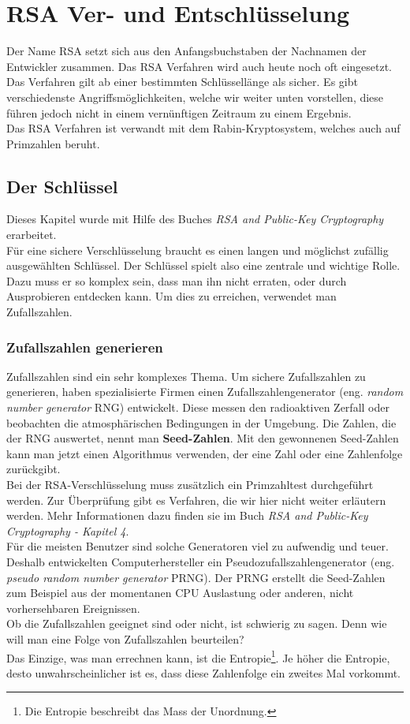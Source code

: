 \newpage
\section{RSA Ver- und Entschlüsselung}
Der Name RSA setzt sich aus den Anfangsbuchstaben der Nachnamen der Entwickler zusammen. Das RSA Verfahren wird auch heute noch oft eingesetzt. Das Verfahren gilt ab einer bestimmten Schlüssellänge als sicher. Es gibt verschiedenste Angriffsmöglichkeiten, welche wir weiter unten vorstellen, diese führen jedoch nicht in einem vernünftigen Zeitraum zu einem Ergebnis. \\
Das RSA Verfahren ist verwandt mit dem Rabin-Kryptosystem, welches auch auf Primzahlen beruht. %

\subsection{Der Schlüssel}
Dieses Kapitel wurde mit Hilfe des Buches \textit{RSA and Public-Key Cryptography} erarbeitet.\\[2ex]
%
Für eine sichere Verschlüsselung braucht es einen langen und möglichst zufällig ausgewählten Schlüssel. Der Schlüssel spielt also eine zentrale und wichtige Rolle. Dazu muss er so komplex sein, dass man ihn nicht erraten, oder durch Ausprobieren entdecken kann. Um dies zu erreichen, verwendet man Zufallszahlen.
%
\subsubsection{Zufallszahlen generieren}
Zufallszahlen sind ein sehr komplexes Thema. Um sichere Zufallszahlen zu generieren, haben spezialisierte Firmen einen Zufallszahlengenerator (eng. \textit{random number generator} RNG) entwickelt. Diese messen den radioaktiven Zerfall oder beobachten die atmosphärischen Bedingungen in der Umgebung. Die Zahlen, die der RNG auswertet, nennt man \textbf{Seed-Zahlen}. Mit den gewonnenen Seed-Zahlen kann man jetzt einen Algorithmus verwenden, der eine Zahl oder eine Zahlenfolge zurückgibt.\\
Bei der RSA-Verschlüsselung muss zusätzlich ein Primzahltest durchgeführt werden.
Zur Überprüfung gibt es Verfahren, die wir hier nicht weiter erläutern werden. Mehr Informationen dazu finden sie im Buch \textit{RSA and Public-Key Cryptography - Kapitel 4}.\\
%
Für die meisten Benutzer sind solche Generatoren viel zu aufwendig und teuer. Deshalb entwickelten Computerhersteller ein Pseudozufallszahlengenerator (eng. \textit{pseudo random number generator} PRNG). Der PRNG erstellt die Seed-Zahlen zum Beispiel aus der momentanen CPU Auslastung oder anderen, nicht vorhersehbaren Ereignissen.\\
Ob die Zufallszahlen geeignet sind oder nicht, ist schwierig zu sagen. Denn wie will man eine Folge von Zufallszahlen beurteilen?\\
Das Einzige, was man errechnen kann, ist die Entropie\footnote{Die Entropie beschreibt das Mass der Unordnung.}. Je höher die Entropie, desto unwahrscheinlicher ist es, dass diese Zahlenfolge ein zweites Mal vorkommt.
